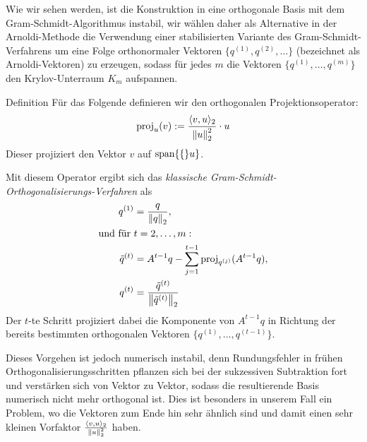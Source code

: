 Wie wir sehen werden, ist die Konstruktion in eine orthogonale Basis mit dem Gram-Schmidt-Algorithmus instabil, 
wir wählen daher als Alternative in der Arnoldi-Methode die Verwendung einer stabilisierten Variante des 
Gram-Schmidt-Verfahrens um eine Folge orthonormaler Vektoren $\{q^{(1)},q^{(2)},\dots\}$ (bezeichnet als 
Arnoldi-Vektoren) zu erzeugen, sodass für jedes $m$ die Vektoren $\{q^{(1)},\dots,q^{(m)}\}$ den Krylov-Unterraum $K_m$ 
aufspannen. 

\begin{colbox}{Definition}
Für das Folgende definieren wir den orthogonalen Projektionsoperator:
%
\begin{align*}
  \text{proj}_u(v) 
  := \dfrac{\langle v,u\rangle_2}{\vertn{2}{u}_2^2}\cdot u
\end{align*}
%
Dieser projiziert den Vektor $v$ auf $\text{span}\{\{\}u\}$.
\end{colbox}

Mit diesem Operator ergibt sich das \textit{klassische Gram-Schmidt-Orthogonalisierungs-Verfahren} als 
%
\begin{align*}
  q^{(1)} 
  &= \dfrac{q}{\vertn{2}{q}_2}, \\
  \text{und für } &t=2,\dots,m: \\
  \tilde{q}^{(t)} 
  &= A^{t-1}q - \sum_{j=1}^{t-1} \text{proj}_{q^{(j)}}(A^{t-1}q), 
  \\
  q^{(t)} 
  &= \dfrac{\tilde{q}^{(t)}}{\vertn{2}{\tilde{q}^{(t)}}_2}
\end{align*}
%
Der $t$-te Schritt projiziert dabei die Komponente von $A^{t-1}q$ in Richtung der bereits bestimmten orthogonalen 
Vektoren $\{q^{(1)},\dots,q^{(t-1)}\}$. 

Dieses Vorgehen ist jedoch numerisch instabil, denn Rundungsfehler in frühen Orthogonalisierungsschritten 
pflanzen sich bei der sukzessiven Subtraktion fort und verstärken sich von Vektor zu Vektor, 
sodass die resultierende Basis numerisch nicht mehr orthogonal ist. Dies ist besonders in unserem Fall ein Problem, 
wo die Vektoren zum Ende hin sehr ähnlich sind und damit einen sehr kleinen Vorfaktor 
$\tfrac{\langle v,u\rangle_2}{\vertn{2}{u}_2^2}$ haben.

